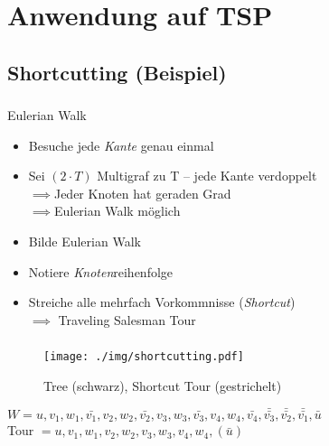 \section{Anwendung auf TSP}

\subsection{Shortcutting (Beispiel)}

\begin{frame}
    \frametitle{\insertsubsection}
    \begin{block}{Eulerian Walk}
        \vspace{0.5em}
        \begin{itemize}
            \itemsep\setlength{0.7em}
            \item Besuche jede \emph{Kante} genau einmal
            \item Sei $(2 \cdot T)$ Multigraf zu T -- jede Kante verdoppelt\\$\implies$Jeder Knoten hat geraden Grad \\$\implies$Eulerian Walk möglich
        \end{itemize}
    \vspace{.8em}
    \end{block}
    \begin{itemize}
        \itemsep\setlength{0.7em}
        \item Bilde Eulerian Walk
        \item Notiere \emph{Knoten}reihenfolge
        \item Streiche alle mehrfach Vorkommnisse (\emph{Shortcut})\\$\implies$ Traveling Salesman Tour
    \end{itemize}
\end{frame}

\begin{frame}
    \frametitle{\insertsubsection}
    \begin{figure}
        \centering
        \texttt{[image: ./img/shortcutting.pdf]}
        \caption{Tree (schwarz), Shortcut Tour (gestrichelt) \cite{recourse2016}}
    \end{figure}
    $W = u, v_1, w_1, \bar{v_1}, v_2, w_2, \bar{v_2}, v_3, w_3, \bar{v_3}, v_4, w_4, \bar{v_4}, \bar{\bar{v_3}}, \bar{\bar{v_2}}, \bar{\bar{v_1}}, \bar{u}$\\
    Tour $= u, v_1, w_1, v_2, w_2 ,v_3, w_3, v_4, w_4, (\bar{u})$
\end{frame}

